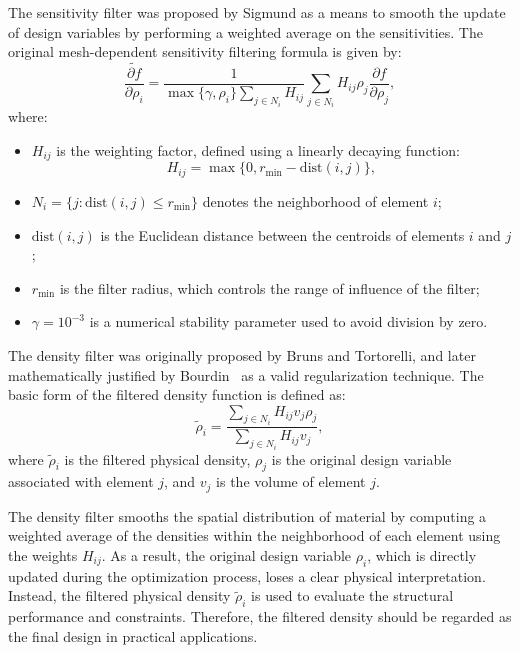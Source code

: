 \documentclass[mathpazo]{cicp}
\begin{document}
The sensitivity filter was proposed by Sigmund\cite{sigmund1997design} as a means to smooth the update of design variables by performing a weighted average on the sensitivities. The original mesh-dependent sensitivity filtering formula is given by:
\begin{equation*}
	\widetilde{\frac{\partial{f}}{\partial\rho_i}} = \frac{1}{\max\{\gamma,\rho_i\}\sum_{j\in{N}_i}H_{ij}}
	\sum_{j\in{N}_i}H_{ij}\rho_j\frac{\partial{f}}{\partial\rho_j},
\end{equation*}
where: 
\begin{itemize} 
	\item $H_{ij}$ is the weighting factor, defined using a linearly decaying function:
	\begin{equation*}
		H_{ij} = \max\{0, r_{\min}-\text{dist}(i,j)\},
	\end{equation*}
	\item $N_i = \{j : \text{dist}(i,j) \leq r_{\min} \}$ denotes the neighborhood of element $i$;
	\item $\text{dist}(i,j)$ is the Euclidean distance between the centroids of elements $i$ and $j$;
	\item $r_{\min}$ is the filter radius, which controls the range of influence of the filter;
	\item $\gamma = 10^{-3}$ is a numerical stability parameter used to avoid division by zero.
\end{itemize}

The density filter was originally proposed by Bruns and Tortorelli\cite{bruns2001topology}, and later mathematically justified by Bourdin~\cite{bourdin2001filters} as a valid regularization technique. The basic form of the filtered density function is defined as:
\begin{equation*}
	\tilde\rho_i = \frac{\sum_{j\in{N}_i}H_{ij}v_j\rho_j}{\sum_{j\in{N}_i}H_{ij}v_j},
\end{equation*}
where $\tilde{\rho}_i$ is the filtered physical density, $\rho_j$ is the original design variable associated with element $j$, and $v_j$ is the volume of element $j$.

The density filter smooths the spatial distribution of material by computing a weighted average of the densities within the neighborhood of each element using the weights $H_{ij}$. As a result, the original design variable $\rho_i$, which is directly updated during the optimization process, loses a clear physical interpretation. Instead, the filtered physical density $\tilde{\rho}_i$ is used to evaluate the structural performance and constraints. Therefore, the filtered density should be regarded as the final design in practical applications.
\end{document}
